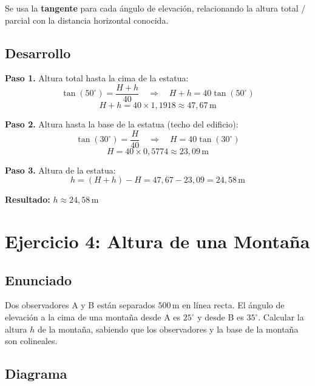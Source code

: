 \documentclass[11pt, letterpaper]{article}
\begin{document}
Se usa la \textbf{tangente} para cada ángulo de elevación, relacionando
la altura total / parcial con la distancia horizontal conocida.

\subsection*{Desarrollo}

\textbf{Paso 1.} Altura total hasta la cima de la estatua:
\[
  \tan(50^\circ) = \frac{H + h}{40}
  \quad\Longrightarrow\quad
  H + h = 40\tan(50^\circ)
\]
\[
  H + h = 40 \times 1{,}1918 \approx 47{,}67\,\text{m} \tag{1}
\]

\textbf{Paso 2.} Altura hasta la base de la estatua (techo del edificio):
\[
  \tan(30^\circ) = \frac{H}{40}
  \quad\Longrightarrow\quad
  H = 40\tan(30^\circ)
\]
\[
  H = 40 \times 0{,}5774 \approx 23{,}09\,\text{m} \tag{2}
\]

\textbf{Paso 3.} Altura de la estatua:
\[
  h = (H + h) - H = 47{,}67 - 23{,}09 = 24{,}58\,\text{m}
\]

\begin{resultbox}
\textbf{Resultado:} \quad \(h \approx 24{,}58\,\text{m}\)
\end{resultbox}

\newpage
\section{Ejercicio 4: Altura de una Montaña}

\subsection*{Enunciado}
Dos observadores A y B están separados \(500\,\text{m}\) en línea recta.
El ángulo de elevación a la cima de una montaña desde A es \(25^\circ\)
y desde B es \(35^\circ\). Calcular la altura \(h\) de la montaña,
sabiendo que los observadores y la base de la montaña son colineales.

\subsection*{Diagrama}
\end{document}
